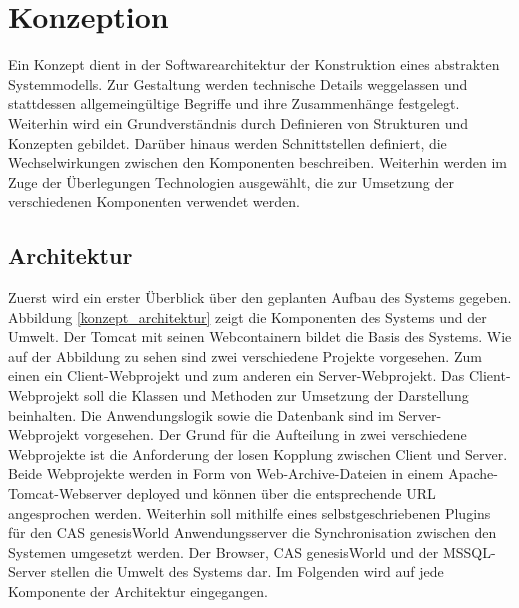
\chapter{Konzeption}
\label{ch:Konzeption}

Ein Konzept dient in der Softwarearchitektur der Konstruktion eines abstrakten Systemmodells. Zur Gestaltung werden technische Details weggelassen und stattdessen allgemeingültige Begriffe und ihre Zusammenhänge festgelegt. Weiterhin wird ein Grundverständnis durch Definieren von Strukturen und Konzepten gebildet. Darüber hinaus werden Schnittstellen definiert, die Wechselwirkungen zwischen den Komponenten beschreiben. Weiterhin werden im Zuge der Überlegungen Technologien ausgewählt, die zur Umsetzung der verschiedenen Komponenten verwendet werden.

\section{Architektur}
\label{ch:Konzeption:architektur}

Zuerst wird ein erster Überblick über den geplanten Aufbau des Systems gegeben. Abbildung \ref{konzept_architektur} zeigt die Komponenten des Systems und der Umwelt. Der Tomcat mit seinen Webcontainern bildet die Basis des Systems. Wie auf der Abbildung zu sehen sind zwei verschiedene Projekte vorgesehen. Zum einen ein Client-Webprojekt und zum anderen ein Server-Webprojekt. Das Client-Webprojekt soll die Klassen und Methoden zur Umsetzung der Darstellung beinhalten. Die Anwendungslogik sowie die Datenbank sind im Server-Webprojekt vorgesehen. Der Grund für die Aufteilung in zwei verschiedene Webprojekte ist die Anforderung der losen Kopplung zwischen Client und Server. Beide Webprojekte werden in Form von Web-Archive-Dateien in einem Apache-Tomcat-Webserver deployed und können über die entsprechende URL angesprochen werden. Weiterhin soll mithilfe eines selbstgeschriebenen Plugins für den CAS genesisWorld Anwendungsserver die Synchronisation zwischen den Systemen umgesetzt werden. Der Browser, CAS genesisWorld und der MSSQL-Server stellen die Umwelt des Systems dar. Im Folgenden wird auf jede Komponente der Architektur eingegangen.

